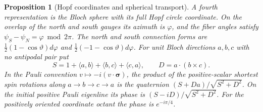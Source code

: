 \documentclass[11pt,reqno]{amsart}
\newtheorem{proposition}[theorem]{Proposition}
\theoremstyle{definition}
\theoremstyle{remark}
\numberwithin{equation}{section}
\newcommand{\ip}[2]{\langle #1,#2\rangle}
\begin{document}
\begin{proposition}[Hopf coordinates and spherical transport]\label{m4:hopf}
A fourth representation is the Bloch sphere with its full Hopf circle coordinate. On the overlap of the north and south gauges its azimuth is $\varphi$, and the fiber angles satisfy $\psi_S-\psi_N=\varphi\bmod 2\pi$. The north and south connection forms are $\frac12(1-\cos\vartheta)d\varphi$ and $\frac12(-1-\cos\vartheta)d\varphi$. For unit Bloch directions $a,b,c$ with no antipodal pair put
\[
 S=1+\ip ab+\ip bc+\ip ca,\qquad D=a\cdot(b\times c).
\]
In the Pauli convention $v\mapsto-i(v\cdot\boldsymbol{\sigma})$, the product of the positive-scalar shortest spin rotations along $a\to b\to c\to a$ is the quaternion $(S+D a)/\sqrt{S^2+D^2}$. On the initial positive Pauli eigenline its phase is $(S-iD)/\sqrt{S^2+D^2}$. For the positively oriented coordinate octant the phase is $e^{-i\pi/4}$.
\end{proposition}
\end{document}
